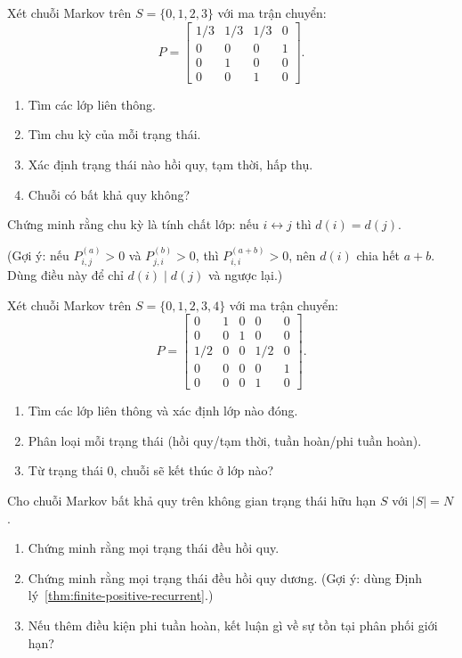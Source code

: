 \begin{exercise}
\label{ex:ch6-1}
Xét chuỗi Markov trên $S = \{0, 1, 2, 3\}$ với ma trận chuyển:
\[
  P = \begin{bmatrix}
    1/3 & 1/3 & 1/3 & 0 \\
    0   & 0   & 0   & 1 \\
    0   & 1   & 0   & 0 \\
    0   & 0   & 1   & 0
  \end{bmatrix}.
\]
\begin{enumerate}[label=(\alph*)]
  \item Tìm các lớp liên thông.
  \item Tìm chu kỳ của mỗi trạng thái.
  \item Xác định trạng thái nào hồi quy, tạm thời, hấp thụ.
  \item Chuỗi có bất khả quy không?
\end{enumerate}
\end{exercise}

\begin{exercise}
\label{ex:ch6-2}
Chứng minh rằng chu kỳ là tính chất lớp: nếu $i \leftrightarrow j$ thì $d(i) = d(j)$.

(Gợi ý: nếu $P_{i,j}^{(a)} > 0$ và $P_{j,i}^{(b)} > 0$, thì $P_{i,i}^{(a+b)} > 0$,
nên $d(i)$ chia hết $a + b$. Dùng điều này để chỉ $d(i) \mid d(j)$ và ngược lại.)
\end{exercise}

\begin{exercise}
\label{ex:ch6-3}
Xét chuỗi Markov trên $S = \{0, 1, 2, 3, 4\}$ với ma trận chuyển:
\[
  P = \begin{bmatrix}
    0 & 1 & 0 & 0 & 0 \\
    0 & 0 & 1 & 0 & 0 \\
    1/2 & 0 & 0 & 1/2 & 0 \\
    0 & 0 & 0 & 0 & 1 \\
    0 & 0 & 0 & 1 & 0
  \end{bmatrix}.
\]
\begin{enumerate}[label=(\alph*)]
  \item Tìm các lớp liên thông và xác định lớp nào đóng.
  \item Phân loại mỗi trạng thái (hồi quy/tạm thời, tuần hoàn/phi tuần hoàn).
  \item Từ trạng thái 0, chuỗi sẽ kết thúc ở lớp nào?
\end{enumerate}
\end{exercise}

\begin{exercise}
\label{ex:ch6-4}
Cho chuỗi Markov bất khả quy trên không gian trạng thái hữu hạn $S$ với $|S| = N$.
\begin{enumerate}[label=(\alph*)]
  \item Chứng minh rằng mọi trạng thái đều hồi quy.
  \item Chứng minh rằng mọi trạng thái đều hồi quy dương. (Gợi ý: dùng Định lý~\ref{thm:finite-positive-recurrent}.)
  \item Nếu thêm điều kiện phi tuần hoàn, kết luận gì về sự tồn tại phân phối giới hạn?
\end{enumerate}
\end{exercise}
